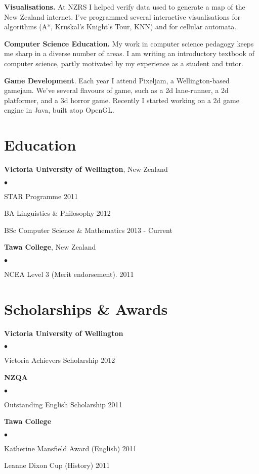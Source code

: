 \documentclass[margin,line]{res}
\newenvironment{list2}{
  \begin{list}{$\bullet$}{%
      \setlength{\itemsep}{0in}
      \setlength{\parsep}{0in} \setlength{\parskip}{0in}
      \setlength{\topsep}{0in} \setlength{\partopsep}{0in}
      \setlength{\leftmargin}{0.2in}}}
  {\end{list}}
\begin{document}
\begin{resume}
{\bf Visualisations.} At NZRS I helped verify data used to generate a map of the New Zealand internet. I've programmed several interactive visualisations for algorithms (A*, Kruskal's Knight's Tour, KNN) and for cellular automata.

{\bf Computer Science Education.} My work in computer science pedagogy keeps me sharp in a diverse number of areas. I am writing an introductory textbook of computer science, partly motivated by my experience as a student and tutor.

{\bf Game Development}. Each year I attend Pixeljam, a Wellington-based gamejam. We've several flavours of game, such as a 2d lane-runner, a 2d platformer, and a 3d horror game. Recently I started working on a 2d game engine in Java, built atop OpenGL.

\section{\sc Education}
{\bf Victoria University of Wellington}, New Zealand
\begin{list2}
	\item STAR Programme \hfill 2011
	\item BA Linguistics \& Philosophy \hfill 2012
	\item BSc Computer Science \& Mathematics \hfill 2013 - Current
\end{list2}

{\bf Tawa College}, New Zealand
\begin{list2}
	\item NCEA Level 3 (Merit endorsement). \hfill 2011
\end{list2}

\section{\sc Scholarships \& Awards}

{\bf Victoria University of Wellington}
\begin{list2}
	\item Victoria Achievers Scholarship \hfill 2012
\end{list2}

{\bf NZQA}
\begin{list2}
	\item Outstanding English Scholarship \hfill 2011
\end{list2}

{\bf Tawa College}
\begin{list2}
	\item Katherine Mansfield Award (English) \hfill 2011
	\item Leanne Dixon Cup (History) \hfill 2011
\end{list2}


\end{resume}
\end{document}

